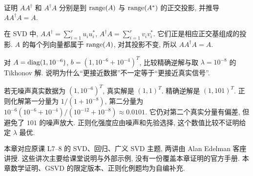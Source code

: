 \begin{exercise}
证明 $AA^\dagger$ 和 $A^\dagger A$ 分别是到 $\operatorname{range}(A)$ 与 $\operatorname{range}(A^*)$ 的正交投影, 并推导 $AA^\dagger A=A$.
\end{exercise}
\begin{solution}
在 SVD 中, $AA^\dagger=\sum_{i=1}^ru_iu_i^*$, $A^\dagger A=\sum_{i=1}^rv_iv_i^*$. 它们正是相应正交基组成的投影. $A$ 的每个列向量都属于 $\operatorname{range}(A)$, 对其投影不变, 所以 $AA^\dagger A=A$.
\end{solution}
\begin{exercise}
对 $A=\operatorname{diag}(1,10^{-6})$, $b=(1,10^{-6}+10^{-4})^T$, 比较精确逆解与取 $\lambda=10^{-8}$ 的 Tikhonov 解. 说明为什么“更接近数据”不一定等于“更接近真实信号”.
\end{exercise}
\begin{solution}
若无噪声真实数据为 $(1,10^{-6})^T$, 真实解是 $(1,1)^T$. 精确逆解是 $(1,101)^T$. 正则化解第一分量为 $1/(1+10^{-8})$, 第二分量为 $10^{-6}(10^{-6}+10^{-4})/(10^{-12}+10^{-8})\approx0.0101$. 它仍对第二个真实分量有偏差, 但避免了 $101$ 的噪声放大. 正则化强度应由噪声和先验选择, 这个数值比较不证明给定 $\lambda$ 最优.
\end{solution}
\begin{remark}
本章对应原课 L7--8 的 SVD、回归、广义 SVD 主题, 两讲由 Alan Edelman 客座讲授. 这些讲次主要给课堂说明与外部示例, 没有一份覆盖本章证明的官方手册. 本章数学证明、GSVD 的限定版本、正则化例题均为自编补充.
\end{remark}
